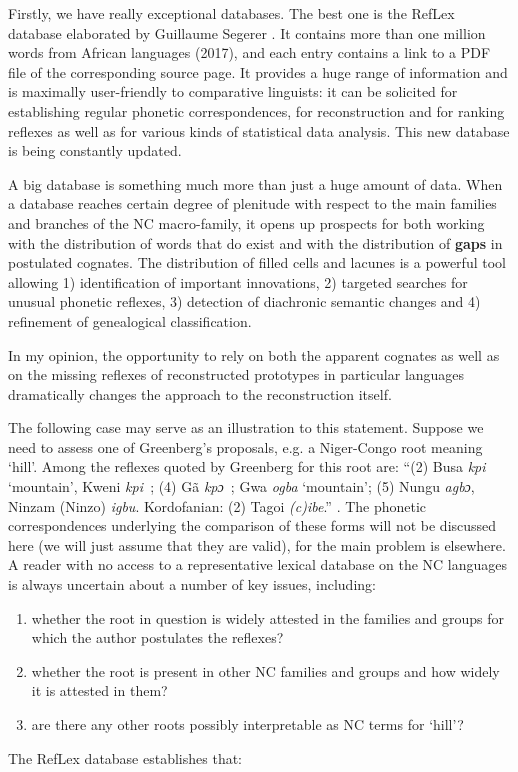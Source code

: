 Firstly, we have really exceptional databases. The best one is the RefLex database elaborated by Guillaume Segerer \citep{SegererFlavier}. It contains more than one million words from African languages (2017), and each entry contains a link to a PDF file of the corresponding source page. It provides a huge range of information and is maximally user-friendly to comparative linguists: it can be solicited for establishing regular phonetic correspondences, for reconstruction and for ranking reflexes as well as for various kinds of statistical data analysis. This new database is being constantly updated. 

A big database is something much more than just a huge amount of data. When a database  reaches certain degree of plenitude with respect to the main families and branches of the NC macro-family, it opens up prospects for both working with the distribution of words that do exist and with the distribution of \textbf{gaps} in postulated cognates. The distribution of filled cells and lacunes is a powerful tool allowing 1) identification of important innovations, 2) targeted searches for unusual phonetic reflexes, 3) detection of diachronic semantic changes and 4) refinement of genealogical classification.

In my opinion, the opportunity to rely on both the apparent cognates as well as on the missing reflexes of reconstructed prototypes in particular languages dramatically changes the approach to the reconstruction itself.

The following case may serve as an illustration to this statement. Suppose we need to assess one of Greenberg’s proposals, e.g. a Niger-Congo root meaning ‘hill’. Among the reflexes quoted by Greenberg for this root are: “(2) Busa \textit{kpi} ‘mountain’, Kweni  \textit{kpi~}; (4) Gã \textit{kpɔ~}; Gwa \textit{ogba} ‘mountain’; (5) Nungu \textit{agbɔ}, Ninzam (Ninzo) \textit{igbu}. Kordofanian: (2) Tagoi \textit{(c)ibe}.” \citep[155]{Greenberg1966}. The phonetic correspondences underlying the comparison of these forms will not be discussed here (we will just assume that they are valid), for the main problem is elsewhere. A reader with no access to a representative lexical database on the NC languages is always uncertain about a number of key issues, including:

\begin{enumerate}
\item whether the root in question is widely attested in the families and groups for which the author postulates the reflexes?
\item whether the root is present in other NC families and groups and how widely it is attested in them?
\item are there any other roots possibly interpretable as NC terms for ‘hill’?
\end{enumerate}
The RefLex database establishes  that: 

